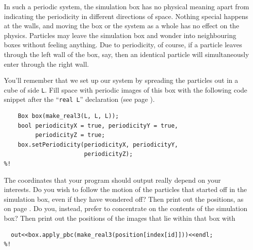 In such a periodic system, the simulation box has no physical meaning apart from 
indicating the periodicity in different directions of space. Nothing special 
happens at the walls, and moving the box or the system as a whole has no effect 
on the physics. Particles may leave the simulation box and wonder into 
neighbouring boxes without feeling anything. Due to periodicity, of course, if a 
particle leaves through the left wall of the box, say, then an identical 
particle will simultaneously enter through the right wall.

You'll remember that we set up our system by spreading the particles out in a
cube of side \texttt{L}. Fill space with periodic images of this box with the
following code snippet after the ``\texttt{real L}'' declaration (see page
\pageref{initialConditions}).
\begin{lstlisting}
    Box box(make_real3(L, L, L));
    bool periodicityX = true, periodicityY = true,
         periodicityZ = true;
    box.setPeriodicity(periodicityX, periodicityY,
                       periodicityZ);
%!
\end{lstlisting}
The coordinates that your program should output really depend on your interests. 
Do you wish to follow the motion of the particles that started off in the 
simulation box, even if they have wondered off? Then print out the positions, as 
on page \pageref{particlePositions}. Do you, instead, prefer to concentrate on 
the contents of the simulation box? Then print out the positions of the images 
that lie within that box with
\begin{lstlisting}
  out<<box.apply_pbc(make_real3(position[index[id]]))<<endl;
%!
\end{lstlisting}

